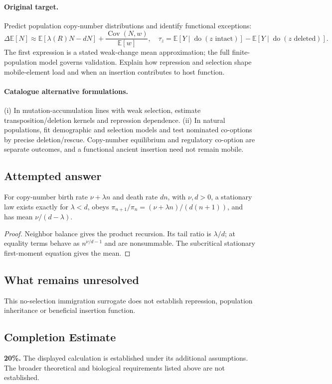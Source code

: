 \documentclass[11pt]{article}
\begin{document}
\paragraph{Original target.}
Predict population copy-number distributions and identify functional exceptions:
\[
\Delta\mathbb{E}[N]\approx\mathbb{E}[\lambda(R)N-dN]+\frac{\operatorname{Cov}(N,w)}{\mathbb{E}[w]},
\quad \tau_z=\mathbb{E}[Y\mid\operatorname{do}(z\text{ intact})]-\mathbb{E}[Y\mid\operatorname{do}(z\text{ deleted})].
\]
The first expression is a stated weak-change mean approximation; the full finite-population model governs validation. Explain how repression and selection shape mobile-element load and when an insertion contributes to host function.
\paragraph{Catalogue alternative formulations.}
(i) In mutation-accumulation lines with weak selection, estimate transposition/deletion kernels and repression dependence. (ii) In natural populations, fit demographic and selection models and test nominated co-options by precise deletion/rescue. Copy-number equilibrium and regulatory co-option are separate outcomes, and a functional ancient insertion need not remain mobile.
\subsection{Attempted answer}
\begin{proposition}
For copy-number birth rate $\nu+\lambda n$ and death rate $dn$, with $\nu,d>0$, a stationary law exists exactly for $\lambda<d$, obeys $\pi_{n+1}/\pi_n=(\nu+\lambda n)/(d(n+1))$, and has mean $\nu/(d-\lambda)$.
\end{proposition}
\begin{proof}
Neighbor balance gives the product recursion. Its tail ratio is $\lambda/d$; at equality terms behave as $n^{\nu/d-1}$ and are nonsummable. The subcritical stationary first-moment equation gives the mean.
\end{proof}
\subsection{What remains unresolved}
This no-selection immigration surrogate does not establish repression, population inheritance or beneficial insertion function.
\subsection{Completion Estimate}
\textbf{20\%.} The displayed calculation is established under its additional assumptions. The broader theoretical and biological requirements listed above are not established.
\end{document}
